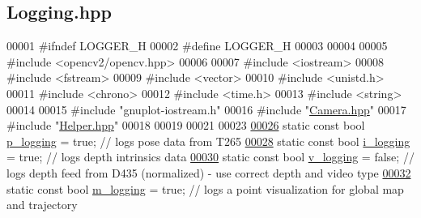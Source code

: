 \hypertarget{Logging_8hpp_source}{}\subsection{Logging.\+hpp}
\label{Logging_8hpp_source}

\begin{DoxyCode}
00001 \textcolor{preprocessor}{#ifndef LOGGER\_H}
00002 \textcolor{preprocessor}{#define LOGGER\_H}
00003 
00004 
00005 \textcolor{preprocessor}{#include <opencv2/opencv.hpp>}
00006 
00007 \textcolor{preprocessor}{#include <iostream>}
00008 \textcolor{preprocessor}{#include <fstream>}
00009 \textcolor{preprocessor}{#include <vector>}
00010 \textcolor{preprocessor}{#include <unistd.h>}
00011 \textcolor{preprocessor}{#include <chrono>}
00012 \textcolor{preprocessor}{#include <time.h>}
00013 \textcolor{preprocessor}{#include <string>}
00014 
00015 \textcolor{preprocessor}{#include "gnuplot-iostream.h"}
00016 \textcolor{preprocessor}{#include "\hyperlink{Camera_8hpp}{Camera.hpp}"}
00017 \textcolor{preprocessor}{#include "\hyperlink{Helper_8hpp}{Helper.hpp}"}
00018 
00019 
00021 
00023 
\hypertarget{Logging_8hpp_source.tex_l00026}{}\hyperlink{Logging_8hpp_a2fe143d334b5c5fd12da86fe05423074}{00026} \textcolor{keyword}{static} \textcolor{keyword}{const} \textcolor{keywordtype}{bool} \hyperlink{Logging_8hpp_a2fe143d334b5c5fd12da86fe05423074}{p\_logging} = \textcolor{keyword}{true}; \textcolor{comment}{// logs pose data from T265}
\hypertarget{Logging_8hpp_source.tex_l00028}{}\hyperlink{Logging_8hpp_af862762a869dc8c1eda840a8ca645e15}{00028} \textcolor{comment}{}\textcolor{keyword}{static} \textcolor{keyword}{const} \textcolor{keywordtype}{bool} \hyperlink{Logging_8hpp_af862762a869dc8c1eda840a8ca645e15}{i\_logging} = \textcolor{keyword}{true}; \textcolor{comment}{// logs depth intrinsics data}
\hypertarget{Logging_8hpp_source.tex_l00030}{}\hyperlink{Logging_8hpp_adaf32a6a0736e8e3da49a3c2b0705fa7}{00030} \textcolor{comment}{}\textcolor{keyword}{static} \textcolor{keyword}{const} \textcolor{keywordtype}{bool} \hyperlink{Logging_8hpp_adaf32a6a0736e8e3da49a3c2b0705fa7}{v\_logging} = \textcolor{keyword}{false}; \textcolor{comment}{// logs depth feed from D435 (normalized) - use correct depth
       and video type}
\hypertarget{Logging_8hpp_source.tex_l00032}{}\hyperlink{Logging_8hpp_a3beae9ccc576e738591191c70cf26623}{00032} \textcolor{comment}{}\textcolor{keyword}{static} \textcolor{keyword}{const} \textcolor{keywordtype}{bool} \hyperlink{Logging_8hpp_a3beae9ccc576e738591191c70cf26623}{m\_logging} = \textcolor{keyword}{true}; \textcolor{comment}{// logs a point visualization for global map and trajectory}

\end{DoxyCode}
